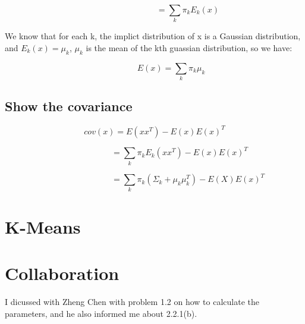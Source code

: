 \documentclass{article} %
\begin{document}
\begin{equation}
\qquad \qquad \qquad \qquad
= \sum_k \pi_k E_k (x)
\end{equation}

We know that for each k, the implict distribution of x is a Gaussian
distribution, and $E_k (x) = \mu_k$, $\mu_k$ is the mean of the kth guassian
distribution, so we have:

\begin{equation}
\qquad \qquad
E (x) = \sum_k \pi_k \mu_k
\end{equation}


\subsection{Show the covariance}
\begin{equation}
cov (x) = E (x x^T) - E (x) E(x)^T
\end{equation}

\begin{equation}
\qquad \qquad \qquad
= \sum_k \pi_k E_k (x x^T) - E (x) E(x)^T
\end{equation}

\begin{equation}
\qquad \qquad \qquad \qquad
= \sum_k \pi_k (\Sigma_k + \mu_k \mu_k^T) - E (X) E (x)^T
\end{equation}







\section{K-Means}

\section{Collaboration}
I dicussed with Zheng Chen with problem 1.2 on how to calculate the parameters,
and he also informed me about 2.2.1(b).
\end{document}
